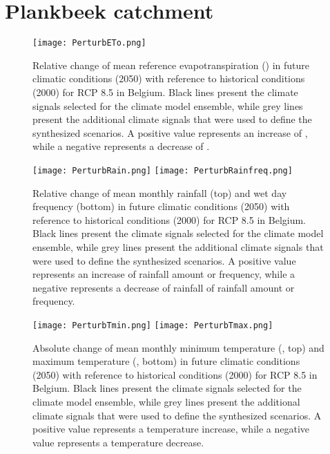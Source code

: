 \chapter{Plankbeek catchment}\label{ch:appendixB}

\begin{figure}[tbhp]
	\centering
		\texttt{[image: PerturbETo.png]}
	\caption{Relative change of mean reference evapotranspiration (\ETo) in future climatic conditions (2050) with reference to historical conditions (2000) for RCP 8.5 in Belgium. Black lines present the climate signals selected for the climate model ensemble, while grey lines present the additional climate signals that were used to define the synthesized scenarios. A positive value represents an increase of \ETo, while a negative represents a decrease of \ETo.}
	\label{fig:AppB_PerturbETo}
\end{figure} 

\begin{figure}[tbhp]
	\centering
		\texttt{[image: PerturbRain.png]}
		\texttt{[image: PerturbRainfreq.png]}
	\caption{Relative change of mean monthly rainfall (top) and wet day frequency (bottom) in future climatic conditions (2050) with reference to historical conditions (2000) for RCP 8.5 in Belgium. Black lines present the climate signals selected for the climate model ensemble, while grey lines present the additional climate signals that were used to define the synthesized scenarios. A positive value represents an increase of rainfall amount or frequency, while a negative represents a decrease of rainfall of rainfall amount or frequency.}
	\label{fig:AppB_PerturbRain}
\end{figure} 

\begin{figure}[tbhp]
	\centering
		\texttt{[image: PerturbTmin.png]}
		\texttt{[image: PerturbTmax.png]}
	\caption{Absolute change of mean monthly minimum temperature (\Tmin, top) and maximum temperature (\Tmax, bottom) in future climatic conditions (2050) with reference to historical conditions (2000) for RCP 8.5 in Belgium. Black lines present the climate signals selected for the climate model ensemble, while grey lines present the additional climate signals that were used to define the synthesized scenarios. A positive value represents a temperature increase, while a negative value represents a temperature decrease.}
	\label{fig:AppB_PerturbTemp}
\end{figure} 


